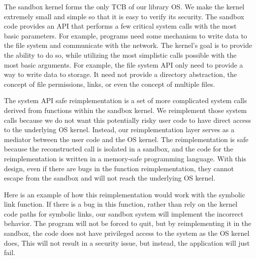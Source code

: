 {The sandbox kernel forms the only TCB of our library OS. 
We make the kernel extremely small and simple so that it is easy to verify its security. 
The sandbox code provides an API that performs
a few critical system calls with the most basic parameters.  For example,
programs need some mechanism to write data to the file system
and communicate with the network.  The kernel's goal is to provide the ability
to do so, while utilizing the most simplistic calls possible with the most
basic arguments. For example, the file system API only need to provide a way
to write data to storage.  It need not provide a directory abstraction, the
concept of file permissions, links, or even the concept of multiple files.


The system API safe reimplementation is a set of more complicated system calls
derived from functions within the sandbox kernel. 
We reimplement those system calls because we do not want this potentially risky user code
to have direct access to the underlying OS kernel.
Instead, our reimplementation layer serves as a mediator between the user code
and the OS kernel. The reimplementation is safe
because the reconstructed call is isolated in a sandbox, and the code for the
reimplementation is written in a memory-safe programming language.
With this design, even if there are bugs in the function reimplementation,
they cannot escape from the sandbox and will not reach the underlying OS kernel.

Here is an example of how this reimplementation would work with the symbolic link function.
If there is a bug in this function, rather than rely on the kernel code paths
for symbolic links, our sandbox system will implement the incorrect behavior.
The program will not be forced to quit, but by reimplementing it in the sandbox,
the code does not have privileged access to the system as the OS kernel does,
This will not result in a security issue, but instead, the application will just fail.

}
